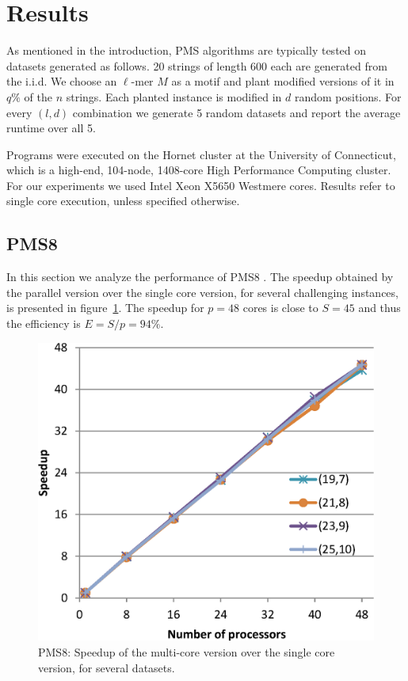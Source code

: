 \section{Results}
\label{sec_pms_results}


As mentioned in the introduction, PMS algorithms are typically tested on
datasets generated as follows. 20 strings of length 600 each are generated from
the i.i.d. We choose an
$\ell$-mer $M$ as a motif and plant modified versions of it in $q\%$ of the
$n$ strings. Each planted instance is modified in $d$ random positions.
For every $(l,d)$ combination we generate 5 random datasets and report the
average runtime over all 5.

Programs were executed on the Hornet cluster at the University of Connecticut, 
which is a high-end, 104-node, 1408-core High Performance Computing cluster. 
For our experiments we used Intel Xeon X5650 Westmere cores. Results refer to
single core execution, unless specified otherwise.

\subsection{PMS8}
In this section we analyze the performance of PMS8 \cite{NRPMS14}.
The speedup obtained by the parallel version over the single core version,
for several challenging instances, is presented in figure~\ref{PMS8figSpeedup}.
The speedup for $p=48$ cores is close to $S=45$ and thus the
efficiency is $E=S/p=94\%$.

\begin{figure}
\caption{PMS8: Speedup of the multi-core version over the single core
version, for several datasets.}\label{PMS8figSpeedup} 
\includegraphics[width=\linewidth]{PMS8speedup}
\end{figure}

